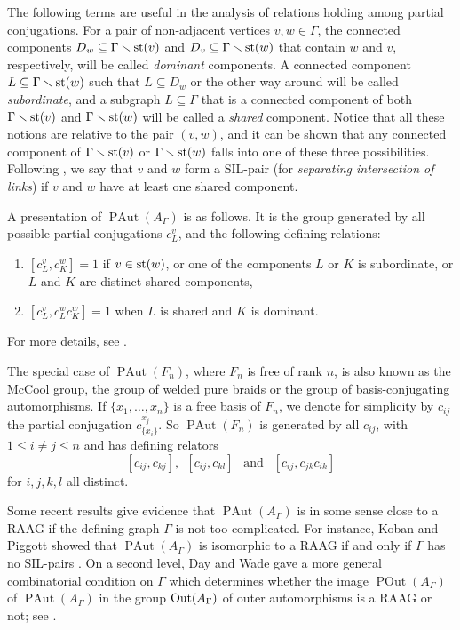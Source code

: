 \documentclass[10pt]{amsart}
\theoremstyle{definition}
\newcommand{\Out}{{\rm Out}}
\newcommand{\st}{{\rm st}}
\newcommand{\PAut}{\operatorname{PAut}}
\newcommand{\POut}{\operatorname {POut}}
\theoremstyle{definition}
\numberwithin{equation}{section}
\begin{document}
The following terms are useful in the analysis of relations holding among partial conjugations. For a pair of non-adjacent vertices $v,w \in \Gamma$, the connected components $D_w \subseteq \Gamma \smallsetminus \st(v)$ and
$D_v \subseteq \Gamma \smallsetminus \st(w)$ that contain $w$ and $v$, respectively, will be called \emph{dominant} components. A connected component $L\subseteq \Gamma\smallsetminus\st(w)$ such that $L\subseteq D_w$ or the other way around will be called \emph{subordinate}, and a subgraph $L \subseteq \Gamma$ that is a connected component of both $\Gamma \smallsetminus \st(v)$ and $\Gamma \smallsetminus \st(w)$ will be called a \emph{shared} component. Notice that all these notions are relative to the pair $(v,w)$, and it can be shown that any connected component of $\Gamma \smallsetminus \st(v)$ or $\Gamma \smallsetminus \st(w)$ falls into one of these three possibilities. Following \cite{CRSV}, we say that $v$ and $w$ form a SIL-pair (for \emph{separating intersection of links}) if $v$ and $w$ have at least one shared component.

A presentation of $\PAut(A_\Gamma)$ is as follows. It is the group generated by all possible partial conjugations $c_L^v$, and the following defining relations:
\begin{enumerate}
 \item $[c_L^v, c_K^w]=1$ if $v \in \st(w)$, or one of the components $L$ or $K$ is subordinate, or $L$ and $K$ are distinct shared components,
 \item $[c_L^v, c_L^w c_K^w]=1$ when $L$ is shared and $K$ is dominant.
 \end{enumerate}
For more details, see \cite[Chapter~3]{Toinet}.

The special case of $\PAut(F_n)$, where $F_n$ is free of rank $n$, is also known as the McCool group, the group of welded pure braids or the group of basis-conjugating automorphisms. If $\{x_1, \ldots, x_n\}$ is a free basis of $F_n$, we denote for simplicity by $c_{ij}$ the partial conjugation $c_{\{x_i\}}^{x_j}$. So $\PAut(F_n)$ is generated by all $c_{ij}$, with $1 \leq i \neq j \leq n$ and has defining relators
\[ [c_{ij},c_{kj}], \  \ [c_{ij},c_{kl}] \ \ \text{ and } \ \ [c_{ij}, c_{jk}c_{ik}]\]
for $i,j,k,l$ all distinct.

Some recent results give evidence that $\PAut(A_{\Gamma})$ is in some sense close to a RAAG if the defining graph $\Gamma$ is not too complicated. For instance, Koban and Piggott showed that $\PAut(A_\Gamma)$ is isomorphic to a RAAG if and only if $\Gamma$ has no SIL-pairs \cite{KobanPiggott}. On a second level, Day and Wade  gave a more general combinatorial condition on $\Gamma$ which determines whether the image $\POut(A_\Gamma)$ of $\PAut(A_\Gamma)$ in the group $\Out(A_\Gamma)$ of outer automorphisms is a RAAG or not; see \cite[Theorem~B]{DayWade2018}.
\end{document}
